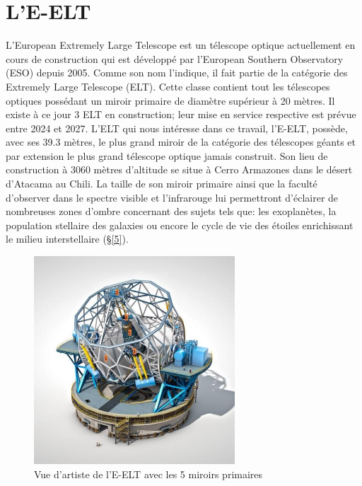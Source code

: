 

\chapter{L'E-ELT}\label{4}

L'European Extremely Large Telescope est un télescope optique actuellement en cours de construction qui est développé par l'European Southern Observatory (ESO) depuis 2005. Comme son nom l'indique, il fait partie de la catégorie des Extremely Large Telescope (ELT). Cette classe contient tout les télescopes optiques possédant un miroir primaire de diamètre supérieur à 20 mètres. Il existe à ce jour 3 ELT en construction; leur mise en service respective est prévue entre 2024 et 2027. L'ELT qui nous intéresse dans ce travail, l'E-ELT, possède, avec ses 39.3 mètres, le plus grand miroir de la catégorie des télescopes géants et par extension le plus grand télescope optique jamais construit. Son lieu de construction à 3060 mètres d'altitude se situe à Cerro Armazones dans le désert d'Atacama au Chili. La taille de son miroir primaire ainsi que la faculté d'observer dans le spectre visible et l'infrarouge lui permettront d'éclairer de nombreuses zones d'ombre concernant des sujets tels que: les exoplanètes, la population stellaire des galaxies ou encore le cycle de vie des étoiles enrichissant le milieu interstellaire (§\ref{5}).

\begin{figure}[H]
	\centering
	\includegraphics[scale=1.35]{images/e-elt_i}
	\caption[Vue d'artiste de l'E-ELT avec les 5 miroirs primaires \label{Fig. 4.1}\newline \url{https://fis-landschaft.de/universum/elt/}]{Vue d'artiste de l'E-ELT avec les 5 miroirs primaires \label{Fig. 4.1}}
	\label{Fig. 4.1}
\end{figure}

